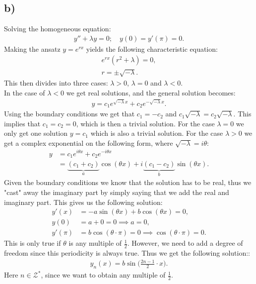 \documentclass[]{article}
\begin{document}
\subsection*{b)}
Solving the homogeneous equation:
\begin{align*}
    y'' + \lambda y = 0;\quad y(0) = y'(\pi) = 0.
\end{align*}
Making the ansatz $y = e^{rx}$ yields the following characteristic equation:
\begin{align*}
    e^{rx}(r^2 + \lambda) = 0,\\
    r = \pm \sqrt{-\lambda}.
\end{align*}
This then divides into three cases: $\lambda> 0$, $\lambda = 0$ and $\lambda < 0$.\\ In the case of $\lambda <0$ we get real solutions, and the general solution becomes:
\begin{align*}
    y = c_1 e^{\sqrt{-\lambda}x} + c_2 e^{-\sqrt{-\lambda}x}.
\end{align*} Using the boundary conditions we get that $c_1 = -c_2$ and $c_1\sqrt{-\lambda} = c_2\sqrt{-\lambda}$. This implies that $c_1 = c_2 = 0$, which is then a trivial solution.
For the case $\lambda = 0$ we only get one solution $y = c_1$ which is also a trivial solution.
For the case $\lambda > 0$ we get a complex exponential on the following form, where $\sqrt{-\lambda} = i \theta$:
\begin{align*}
    y &= c_1 e^{i\theta x} + c_2 e^{-i\theta x}\\
    &= \underbrace{(c_1 + c_2)}_{a}\cos(\theta x) + i\underbrace{(c_1 - c_2)}_{b}\sin(\theta x).
\end{align*} Given the boundary conditions we know that the solution has to be real, thus we "cast" away the imaginary part by simply saying that we add the real and imaginary part. This gives us the following solution: 
\begin{align*}    
    y'(x) &= -a \sin(\theta x) + b \cos(\theta x) = 0,\\
    y(0) &= a + 0 = 0 \implies a = 0,\\
    y'(\pi) &=b\cos(\theta\cdot\pi) = 0 \implies \cos(\theta\cdot\pi) = 0.
\end{align*}This is only true if $\theta$ is any multiple of $\frac{1}{2}$. However, we need to add a degree of freedom since this periodicity is always true. Thus we get the following solution::
\begin{align}
    y_n(x) = b\sin\Bigg(\frac{2n - 1}{2}\cdot x\Bigg).
\end{align}Here $n\in\mathcal{Z}^*$, since we want to obtain any multiple of $\frac{1}{2}$.
\end{document}
